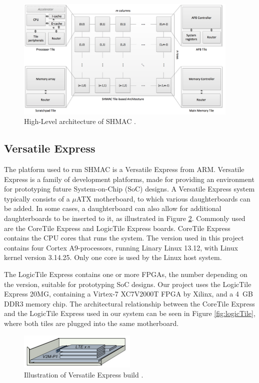 \begin{figure}[htb]
    \centering
    \includegraphics[width=0.95\textwidth]{Figures/Heterogeneous/SHMAC}
    \caption{High-Level architecture of SHMAC \cite{shmac-plan}.}
    \label{fig:shmac}
\end{figure}

\subsection{Versatile Express}

The platform used to run SHMAC is a Versatile Express from ARM.
Versatile Express is a family of development platforms, made for providing an environment for prototyping future System-on-Chip (SoC) designs.
A Versatile Express system typically consists of a $\mu$ATX motherboard, to which various daughterboards can be added.
In some cases, a daughterboard can also allow for additional daughterboards to be inserted to it, as illustrated in Figure \ref{fig:vexpressTiles}. 
Commonly used are the CoreTile Express and LogicTile Express boards. 
CoreTile Express contains the CPU cores that runs the system. The version used in this project contains four Cortex A9-processors, running Linary Linux 13.12,
with Linux kernel version 3.14.25.
Only one core is used by the Linux host system.

The LogicTile Express contains one or more FPGAs, the number depending on the version, suitable for prototyping SoC designs.
Our project uses the LogicTile Express 20MG, containing a Virtex-7 XC7V2000T FPGA by Xilinx, and a 4~GB DDR3 memory chip.
The architectural relationship between the CoreTile Express and the LogicTile Express used in our system can be seen in Figure \ref{fig:logicTile}, where both tiles are plugged into the same motherboard. \cite{VexpressHomepage,LogicTileDataSheet}

\begin{figure}[htb]
    \centering
    \includegraphics[width=0.5\textwidth]{Figures/VersatileExpress/VexpressTiles}
    \caption{Illustration of Versatile Express build \cite{VexpressHomepage}.}
    \label{fig:vexpressTiles}
\end{figure}

